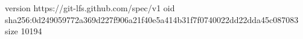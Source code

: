version https://git-lfs.github.com/spec/v1
oid sha256:0d249059772a369d227f906a21f40e5a414b31f7f0740022dd22dda45c087083
size 10194
